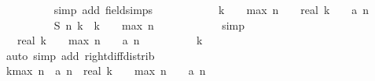 \begin{isabellebody}
\ \ \ \ \ \ \ \ \isamarkupfalse%
\ {\isacharparenleft}simp\ add{\isacharcolon}\ field{\isacharunderscore}simps{\isacharparenright}\isanewline
\ \ \ \ \ \ \isamarkupfalse%
\ \isamarkupfalse%
\ {\isachardoublequoteopen}{\isachardot}{\isachardot}{\isachardot}\ {\isasymle}\ {\isacharparenleft}k\ {\isacharminus}\ {}{\isacharparenright}\ {\isacharasterisk}\ {\isacharquery}max\ {\isacharparenleft}n\ {\isacharminus}\ {}{\isacharparenright}\ {\isacharminus}\ {\isacharparenleft}real\ k\ {\isacharminus}\ {}{\isacharparenright}\ {\isacharasterisk}\ a\ {\isacharparenleft}n{\isacharminus}{}{\isacharparenright}{\isachardoublequoteclose}\isanewline
\ \ \ \ \ \ \ \ \isamarkupfalse%
\ {\isacharbackquoteopen}{\isacharquery}S\ {\isacharparenleft}n{\isacharminus}{}{\isacharparenright}\ {\isacharparenleft}k{\isacharminus}{}{\isacharparenright}\ {\isasymle}\ {\isacharparenleft}k\ {\isacharminus}\ {}{\isacharparenright}\ {\isacharasterisk}\ {\isacharquery}max\ {\isacharparenleft}n\ {\isacharminus}\ {}{\isacharparenright}{\isacharbackquoteclose}\isanewline
\ \ \ \ \ \ \ \ \isamarkupfalse%
\ simp\isanewline
\ \ \ \ \ \ \isamarkupfalse%
\ \isamarkupfalse%
\ {\isachardoublequoteopen}{\isachardot}{\isachardot}{\isachardot}\ {\isacharequal}\ {\isacharparenleft}real\ k\ {\isacharminus}\ {}{\isacharparenright}\ {\isacharasterisk}\ {\isacharparenleft}{\isacharquery}max\ {\isacharparenleft}n\ {\isacharminus}\ {}{\isacharparenright}\ {\isacharminus}\ a\ {\isacharparenleft}n{\isacharminus}{}{\isacharparenright}{\isacharparenright}{\isachardoublequoteclose}\isanewline
\ \ \ \ \ \ \ \ \isamarkupfalse%
\ {\isacharbackquoteopen}k\ {\isasymge}\ {}{\isacharbackquoteclose}\isanewline
\ \ \ \ \ \ \ \ \isamarkupfalse%
\ {\isacharparenleft}auto\ simp\ add{\isacharcolon}\ right{\isacharunderscore}diff{\isacharunderscore}distrib{\isacharparenright}\isanewline
\ \ \ \ \ \ \isamarkupfalse%
\ \isamarkupfalse%
\ {\isachardoublequoteopen}k{\isacharasterisk}{\isacharparenleft}{\isacharquery}max\ n\ {\isacharminus}\ a\ {\isacharparenleft}n{\isacharminus}{}{\isacharparenright}{\isacharparenright}\ {\isasymle}\ {\isacharparenleft}real\ k\ {\isacharminus}\ {}{\isacharparenright}\ {\isacharasterisk}\ {\isacharparenleft}{\isacharquery}max\ {\isacharparenleft}n\ {\isacharminus}\ {}{\isacharparenright}\ {\isacharminus}\ a\ {\isacharparenleft}n{\isacharminus}{}{\isacharparenright}{\isacharparenright}{\isachardoublequoteclose}\isanewline

\end{isabellebody}

